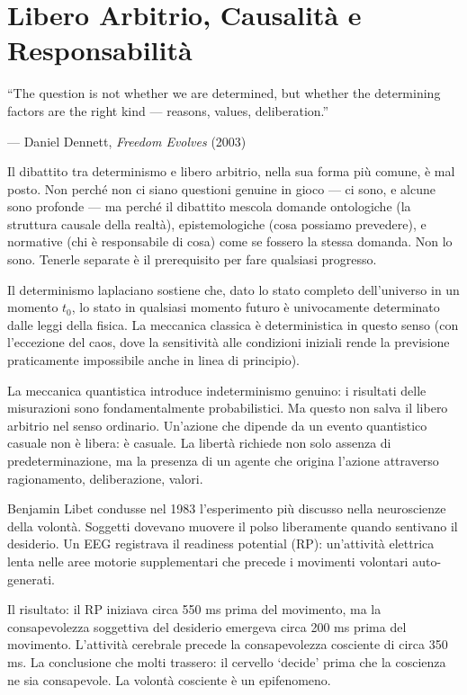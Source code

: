 \documentclass[12pt,a4paper,openany]{book}
\newcommand{\sezione}[1]{\vspace{1.2em}{\large\bfseries #1}\vspace{0.5em}\par}
\begin{document}
\chapter{Libero Arbitrio, Causalità e Responsabilità}

\epigraph{``The question is not whether we are determined, but whether the determining factors are the right kind — reasons, values, deliberation.''}{--- Daniel Dennett, \textit{Freedom Evolves} (2003)}

\sezione{Il dibattito mal posto}

Il dibattito tra determinismo e libero arbitrio, nella sua forma più comune, è mal posto. Non perché non ci siano questioni genuine in gioco — ci sono, e alcune sono profonde — ma perché il dibattito mescola domande ontologiche (la struttura causale della realtà), epistemologiche (cosa possiamo prevedere), e normative (chi è responsabile di cosa) come se fossero la stessa domanda. Non lo sono. Tenerle separate è il prerequisito per fare qualsiasi progresso.

\sezione{Il determinismo fisico e le sue versioni}

Il determinismo laplaciano sostiene che, dato lo stato completo dell'universo in un momento $t_0$, lo stato in qualsiasi momento futuro è univocamente determinato dalle leggi della fisica. La meccanica classica è deterministica in questo senso (con l'eccezione del caos, dove la sensitività alle condizioni iniziali rende la previsione praticamente impossibile anche in linea di principio).

La meccanica quantistica introduce indeterminismo genuino: i risultati delle misurazioni sono fondamentalmente probabilistici. Ma questo non salva il libero arbitrio nel senso ordinario. Un'azione che dipende da un evento quantistico casuale non è libera: è casuale. La libertà richiede non solo assenza di predeterminazione, ma la presenza di un agente che origina l'azione attraverso ragionamento, deliberazione, valori.

\sezione{I dati di Libet e la loro corretta interpretazione}

Benjamin Libet condusse nel 1983 l'esperimento più discusso nella neuroscienze della volontà. Soggetti dovevano muovere il polso liberamente quando sentivano il desiderio. Un EEG registrava il readiness potential (RP): un'attività elettrica lenta nelle aree motorie supplementari che precede i movimenti volontari auto-generati.

Il risultato: il RP iniziava circa 550 ms prima del movimento, ma la consapevolezza soggettiva del desiderio emergeva circa 200 ms prima del movimento. L'attività cerebrale precede la consapevolezza cosciente di circa 350 ms. La conclusione che molti trassero: il cervello `decide' prima che la coscienza ne sia consapevole. La volontà cosciente è un epifenomeno.
\end{document}

